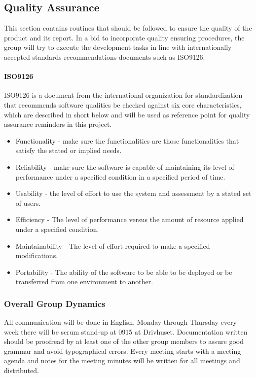 \subsection{Quality Assurance}

This section contains routines that should be followed to ensure the
quality of the product and its report. In a bid to incorporate quality ensuring procedures, the group will try to execute the development tasks in line with internationally accepted standards recommendations documents such as ISO9126.

\paragraph{ISO9126}
ISO9126 is a document from the international organization for standardization that recommends software qualities be checked against six core characteristics, which are described in short below and will be used as reference point for quality assurance reminders in this project\cite{iso:9126}.

\begin{itemize}
		\item Functionality - make sure the functionalities are those functionalities that satisfy the stated or implied needs.
		\item Reliability - make sure the software is capable of maintaining its level of performance under a specified condition in a specified period of time.
		\item Usability - the level of effort to use the system and assessment by a stated set of users.
		\item Efficiency - The level of performance versus the amount of resource applied under a specified condition.
        \item Maintainability - The level of effort required to make a specified modifications.
        \item Portability - The ability of the software to be able to be deployed or be transferred from one environment to another.
\end{itemize}


\subsubsection{Overall Group Dynamics}

All communication will be done in English.
Monday through Thursday every week there will be scrum stand-up at 0915 at Drivhuset.
Documentation written should be proofread by at least one of the other group members
to assure good grammar and avoid typographical errors.
Every meeting starts with a meeting agenda and notes for the meeting minutes will be
written for all meetings and distributed.

